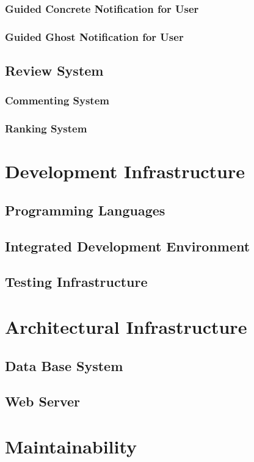  \subsubsection{Guided Concrete Notification for User}
 \subsubsection{Guided Ghost Notification for User}
\subsection{Review System}
  \subsubsection{Commenting System}
  \subsubsection{Ranking System}
\section{Development Infrastructure}
 \subsection{Programming Languages}
 \subsection{Integrated Development Environment}
 \subsection{Testing Infrastructure}
\section{Architectural Infrastructure}
 \subsection{Data Base System}
 \subsection{Web Server}
\section{Maintainability}

